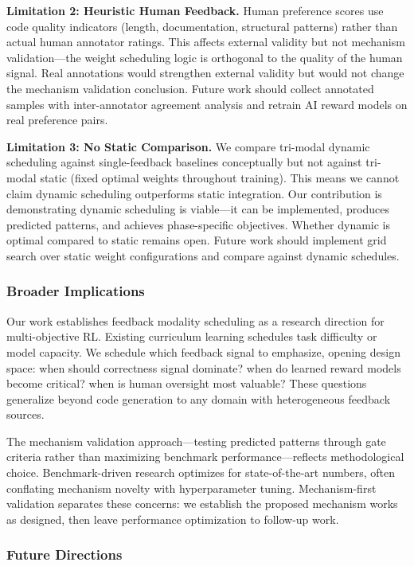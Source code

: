 \textbf{Limitation 2: Heuristic Human Feedback.} Human preference scores use code quality indicators (length, documentation, structural patterns) rather than actual human annotator ratings. This affects external validity but not mechanism validation---the weight scheduling logic is orthogonal to the quality of the human signal. Real annotations would strengthen external validity but would not change the mechanism validation conclusion. Future work should collect annotated samples with inter-annotator agreement analysis and retrain AI reward models on real preference pairs.

\textbf{Limitation 3: No Static Comparison.} We compare tri-modal dynamic scheduling against single-feedback baselines conceptually but not against tri-modal static (fixed optimal weights throughout training). This means we cannot claim dynamic scheduling outperforms static integration. Our contribution is demonstrating dynamic scheduling is viable---it can be implemented, produces predicted patterns, and achieves phase-specific objectives. Whether dynamic is optimal compared to static remains open. Future work should implement grid search over static weight configurations and compare against dynamic schedules.

\subsubsection{Broader Implications}

Our work establishes feedback modality scheduling as a research direction for multi-objective RL. Existing curriculum learning schedules task difficulty or model capacity. We schedule which feedback signal to emphasize, opening design space: when should correctness signal dominate? when do learned reward models become critical? when is human oversight most valuable? These questions generalize beyond code generation to any domain with heterogeneous feedback sources.

The mechanism validation approach---testing predicted patterns through gate criteria rather than maximizing benchmark performance---reflects methodological choice. Benchmark-driven research optimizes for state-of-the-art numbers, often conflating mechanism novelty with hyperparameter tuning. Mechanism-first validation separates these concerns: we establish the proposed mechanism works as designed, then leave performance optimization to follow-up work.

\subsubsection{Future Directions}

